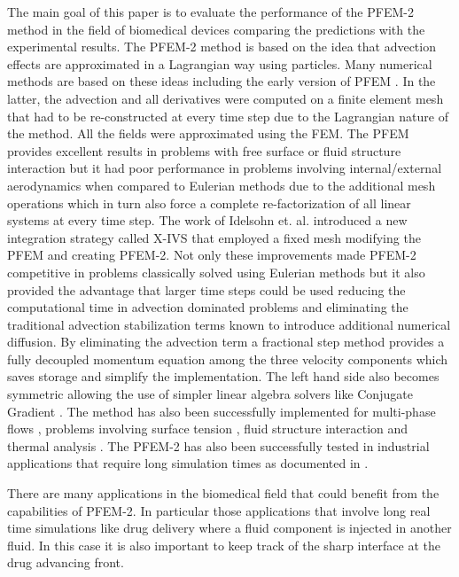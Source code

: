 The main goal of this paper is to evaluate the performance of the PFEM-2 method in the field of biomedical devices comparing the predictions with the experimental results. The PFEM-2 method is based on the idea that advection effects are approximated in a Lagrangian way using particles. Many numerical methods are based on these ideas \cite{sph,pic,mac,mps,mpm} including the early version of PFEM \cite{sergio:pfem}. In the latter, the advection and all derivatives were computed on a finite element mesh that had to be re-constructed at every time step due to the Lagrangian nature of the method. All the fields were approximated using the FEM. The PFEM provides excellent results in problems with free surface or fluid structure interaction but it had poor performance in problems involving internal/external aerodynamics when compared to Eulerian methods due to the additional mesh operations which in turn also force a complete re-factorization of all linear systems at every time step. The work of Idelsohn et. al. \cite{sergio:xivs1,sergio:xivs2} introduced a new integration strategy called X-IVS that employed a fixed mesh modifying the PFEM and creating PFEM-2. Not only these improvements made PFEM-2 competitive in problems classically solved using Eulerian methods but it also provided the advantage that larger time steps could be used \cite{gimenez:parallel} reducing the computational time in advection dominated problems and eliminating the traditional advection stabilization terms known to introduce additional numerical diffusion. By eliminating the advection term a fractional step method provides a fully decoupled momentum equation among the three velocity components which saves storage and simplify the implementation. The left hand side also becomes symmetric allowing the use of simpler linear algebra solvers like Conjugate Gradient \cite{conjgrad}. The method has also been successfully implemented for multi-phase flows \cite{sergio:pfem2_lts,gimenez:fs,gimenez:tesis,salazar}, problems involving surface tension \cite{gimenez:st}, fluid structure interaction \cite{pablo:FSI} and thermal analysis \cite{marti}. The PFEM-2 has also been successfully tested in industrial applications that require long simulation times as documented in \cite{gimenez:ind}.

There are many applications in the biomedical field that could benefit from the capabilities of PFEM-2. In particular those applications that involve long real time simulations like drug delivery where a fluid component is injected in another fluid. In this case it is also important to keep track of the sharp interface at the drug advancing front.

